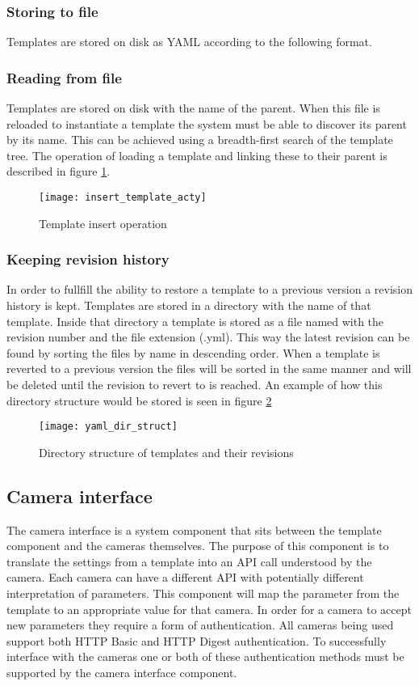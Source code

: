 \subsubsection{Storing to file}
Templates are stored on disk as YAML according to the following format.


\subsubsection{Reading from file}
Templates are stored on disk with the name of the parent. When this file is reloaded to instantiate a template the system must be able to discover its
parent by its name. This can be achieved using a breadth-first search of the template tree.
The operation of loading a template and linking these to their parent is described in figure \ref{fig:inserttemplate}.

\begin{figure}[H]
	\centering
	\texttt{[image: insert\_template\_acty]}
	\caption{Template insert operation}
	\label{fig:inserttemplate}
\end{figure}

\subsubsection{Keeping revision history}
In order to fullfill the ability to restore a template to a previous version a revision history is kept.
Templates are stored in a directory with the name of that template.
Inside that directory a template is stored as a file named with the revision number and the file extension (.yml).
This way the latest revision can be found by sorting the files by name in descending order.
When a template is reverted to a previous version the files will be sorted in the same manner and will be deleted until the revision to revert to is reached. An example of how this directory structure would be stored is seen in figure \ref{fig:diskstruct}

\begin{figure}[H]
	\centering
	\texttt{[image: yaml\_dir\_struct]}
	\caption{Directory structure of templates and their revisions}
	\label{fig:diskstruct}
\end{figure}

\subsection{Camera interface}
The camera interface is a system component that sits between the template component and the cameras themselves. The purpose of this component
is to translate the settings from a template into an API call understood by the camera. Each camera can have a different API with potentially different interpretation of parameters. This component will map the parameter from the template to an appropriate value for that camera.
In order for a camera to accept new parameters they require a form of authentication. All cameras being used support both HTTP Basic and HTTP Digest authentication.
To successfully interface with the cameras one or both of these authentication methods must be supported by the camera interface component.

